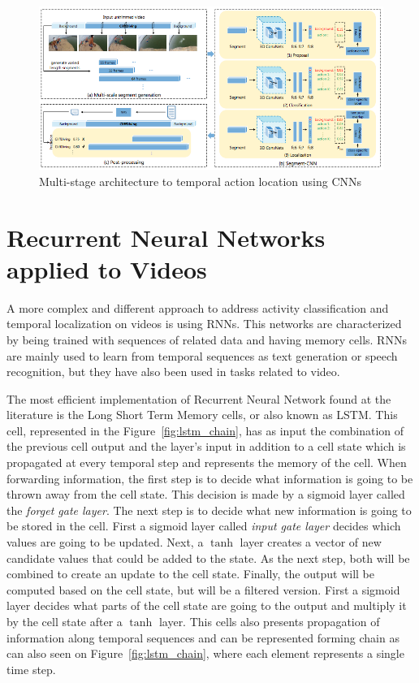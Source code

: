 \begin{figure}[hb]
\begin{center}
\includegraphics[width=1\linewidth]{img/stateofart/multistage}
\end{center}
\caption{Multi-stage architecture to temporal action location using CNNs}
\label{fig:multistage}
\end{figure}


\section{Recurrent Neural Networks applied to Videos}

A more complex and different approach to address activity classification and temporal localization on videos is using RNNs. This networks are characterized by being trained with sequences of related data and having memory cells. RNNs are mainly used to learn from temporal sequences as text generation or speech recognition, but they have also been used in tasks related to video.

The most efficient implementation of Recurrent Neural Network found at the literature is the Long Short Term Memory cells\cite{hochreiter1997long}, or also known as LSTM. This cell, represented in the Figure~\ref{fig:lstm_chain}, has as input the combination of the previous cell output and the layer's input in addition to a cell state which is propagated at every temporal step and represents the memory of the cell.
When forwarding information, the first step is to decide what information is going to be thrown away from the cell state. This decision is made by a sigmoid layer called the \textit{forget gate layer}.
The next step is to decide what new information is going to be stored in the cell. First a sigmoid layer called \textit{input gate layer} decides which values are going to be updated. Next, a $\tanh$ layer creates a vector of new candidate values that could be added to the state. As the next step, both will be combined to create an update to the cell state.
Finally, the output will be computed based on the cell state, but will be a filtered version. First a sigmoid layer decides what parts of the cell state are going to the output and multiply it by the cell state after a $\tanh$ layer.
This cells also presents propagation of information along temporal sequences and can be represented forming chain as can also seen on Figure~\ref{fig:lstm_chain}, where each element represents a single time step.

